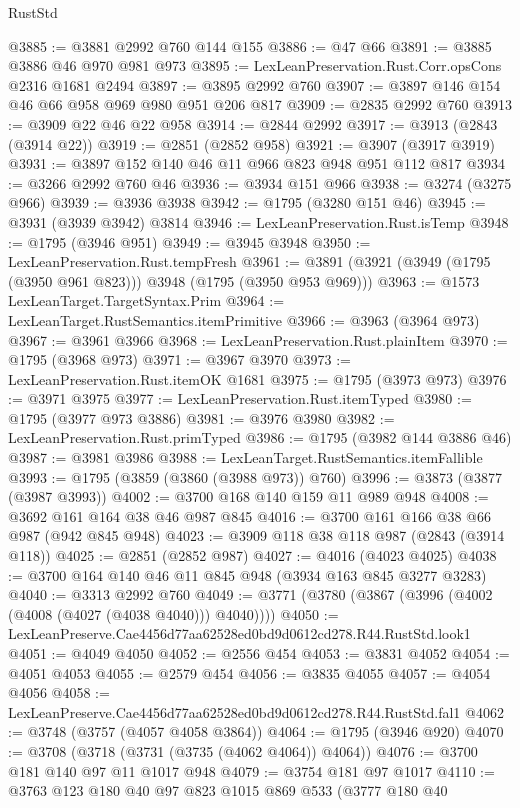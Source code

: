 \begin{lexlean}{RustStd}
\begin{coremodule}
@3885 := @3881 @2992 @760 @144 @155
@3886 := @47 @66
@3891 := @3885 @3886 @46 @970 @981 @973
@3895 := LexLeanPreservation.Rust.Corr.opsCons @2316 @1681 @2494
@3897 := @3895 @2992 @760
@3907 := @3897 @146 @154 @46 @66 @958 @969 @980 @951 @206 @817
@3909 := @2835 @2992 @760
@3913 := @3909 @22 @46 @22 @958
@3914 := @2844 @2992
@3917 := @3913 (@2843 (@3914 @22))
@3919 := @2851 (@2852 @958)
@3921 := @3907 (@3917 @3919)
@3931 := @3897 @152 @140 @46 @11 @966 @823 @948 @951 @112 @817
@3934 := @3266 @2992 @760 @46
@3936 := @3934 @151 @966
@3938 := @3274 (@3275 @966)
@3939 := @3936 @3938
@3942 := @1795 (@3280 @151 @46)
@3945 := @3931 (@3939 @3942) @3814
@3946 := LexLeanPreservation.Rust.isTemp
@3948 := @1795 (@3946 @951)
@3949 := @3945 @3948
@3950 := LexLeanPreservation.Rust.tempFresh
@3961 := @3891 (@3921 (@3949 (@1795 (@3950 @961 @823))) @3948 (@1795 (@3950 @953 @969)))
@3963 := @1573 LexLeanTarget.TargetSyntax.Prim
@3964 := LexLeanTarget.RustSemantics.itemPrimitive
@3966 := @3963 (@3964 @973)
@3967 := @3961 @3966
@3968 := LexLeanPreservation.Rust.plainItem
@3970 := @1795 (@3968 @973)
@3971 := @3967 @3970
@3973 := LexLeanPreservation.Rust.itemOK @1681
@3975 := @1795 (@3973 @973)
@3976 := @3971 @3975
@3977 := LexLeanPreservation.Rust.itemTyped
@3980 := @1795 (@3977 @973 @3886)
@3981 := @3976 @3980
@3982 := LexLeanPreservation.Rust.primTyped
@3986 := @1795 (@3982 @144 @3886 @46)
@3987 := @3981 @3986
@3988 := LexLeanTarget.RustSemantics.itemFallible
@3993 := @1795 (@3859 (@3860 (@3988 @973)) @760)
@3996 := @3873 (@3877 (@3987 @3993))
@4002 := @3700 @168 @140 @159 @11 @989 @948
@4008 := @3692 @161 @164 @38 @46 @987 @845
@4016 := @3700 @161 @166 @38 @66 @987 (@942 @845 @948)
@4023 := @3909 @118 @38 @118 @987 (@2843 (@3914 @118))
@4025 := @2851 (@2852 @987)
@4027 := @4016 (@4023 @4025)
@4038 := @3700 @164 @140 @46 @11 @845 @948 (@3934 @163 @845 @3277 @3283)
@4040 := @3313 @2992 @760
@4049 := @3771 (@3780 (@3867 (@3996 (@4002 (@4008 (@4027 (@4038 @4040))) @4040))))
@4050 := LexLeanPreserve.Cae4456d77aa62528ed0bd9d0612cd278.R44.RustStd.look1
@4051 := @4049 @4050
@4052 := @2556 @454
@4053 := @3831 @4052
@4054 := @4051 @4053
@4055 := @2579 @454
@4056 := @3835 @4055
@4057 := @4054 @4056
@4058 := LexLeanPreserve.Cae4456d77aa62528ed0bd9d0612cd278.R44.RustStd.fal1
@4062 := @3748 (@3757 (@4057 @4058 @3864))
@4064 := @1795 (@3946 @920)
@4070 := @3708 (@3718 (@3731 (@3735 (@4062 @4064)) @4064))
@4076 := @3700 @181 @140 @97 @11 @1017 @948
@4079 := @3754 @181 @97 @1017
@4110 := @3763
    @123
    @180
    @40
    @97
    @823
    @1015
    @869
    @533
    (@3777
      @180
      @40

\end{coremodule}
\end{lexlean}
